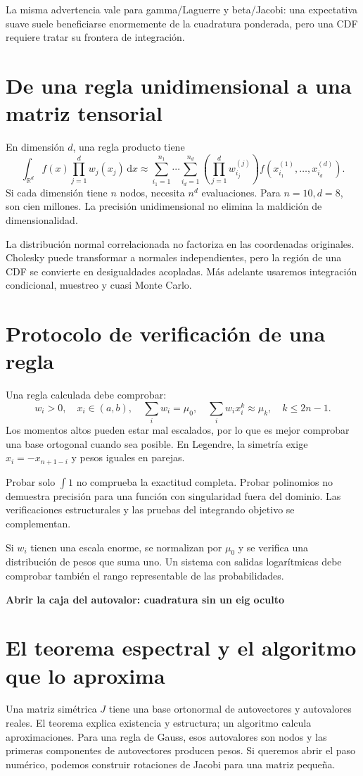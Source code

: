 \documentclass[11pt,a4paper]{article}
\newcommand{\R}{\mathbb R}
\newcommand{\dd}{\,\mathrm d}
\theoremstyle{definition}
\newcommand{\parte}[1]{\par\bigskip\Needspace{8\baselineskip}\begin{center}{\Large\bfseries\color{azul}#1}\end{center}}
\begin{document}
La misma advertencia vale para gamma/Laguerre y beta/Jacobi: una expectativa suave suele beneficiarse enormemente de la cuadratura ponderada, pero una CDF requiere tratar su frontera de integración.

\section{De una regla unidimensional a una matriz tensorial}
En dimensión $d$, una regla producto tiene
\[
\int_{\R^d}f(x)\prod_{j=1}^dw_j(x_j)\dd x
\approx\sum_{i_1=1}^{n_1}\cdots\sum_{i_d=1}^{n_d}
\left(\prod_{j=1}^dw_{i_j}^{(j)}\right)
f(x_{i_1}^{(1)},\ldots,x_{i_d}^{(d)}).
\]
Si cada dimensión tiene $n$ nodos, necesita $n^d$ evaluaciones. Para $n=10,d=8$, son cien millones. La precisión unidimensional no elimina la maldición de dimensionalidad.

La distribución normal correlacionada no factoriza en las coordenadas originales. Cholesky puede transformar a normales independientes, pero la región de una CDF se convierte en desigualdades acopladas. Más adelante usaremos integración condicional, muestreo y cuasi Monte Carlo.

\section{Protocolo de verificación de una regla}
Una regla calculada debe comprobar:
\[
w_i>0,\quad x_i\in(a,b),\quad
\sum_iw_i=\mu_0,\quad
\sum_iw_ix_i^k\approx\mu_k,\quad k\le2n-1.
\]
Los momentos altos pueden estar mal escalados, por lo que es mejor comprobar una base ortogonal cuando sea posible. En Legendre, la simetría exige $x_i=-x_{n+1-i}$ y pesos iguales en parejas.

Probar solo $\int1$ no comprueba la exactitud completa. Probar polinomios no demuestra precisión para una función con singularidad fuera del dominio. Las verificaciones estructurales y las pruebas del integrando objetivo se complementan.

Si $w_i$ tienen una escala enorme, se normalizan por $\mu_0$ y se verifica una distribución de pesos que suma uno. Un sistema con salidas logarítmicas debe comprobar también el rango representable de las probabilidades.



\parte{Abrir la caja del autovalor: cuadratura sin un eig oculto}
\section{El teorema espectral y el algoritmo que lo aproxima}
Una matriz simétrica $J$ tiene una base ortonormal de autovectores y autovalores reales. El teorema explica existencia y estructura; un algoritmo calcula aproximaciones.
Para una regla de Gauss, esos autovalores son nodos y las primeras componentes de autovectores producen pesos.
Si queremos abrir el paso numérico, podemos construir rotaciones de Jacobi para una matriz pequeña.
\end{document}
